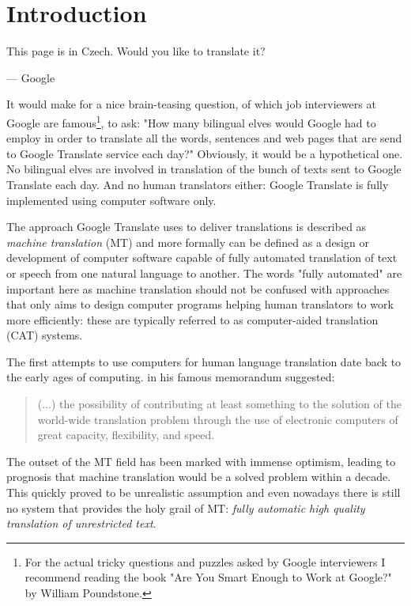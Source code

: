 \chapter{Introduction}
\label{chap:introduction}

\setlength{\epigraphwidth}{1.0\textwidth}
\epigraph{This page is in Czech. Would you like to translate it?}{--- Google}

It would make for a nice brain-teasing question, of which job interviewers
at Google are famous\footnote{For the actual tricky questions and puzzles
asked by Google interviewers I recommend reading the book "Are You Smart
Enough to Work at Google?" by William Poundstone.}, to ask:
"How many bilingual elves would Google had to employ in order to translate
all the words, sentences and web pages that are send to Google Translate
service each day?"
Obviously, it would be a hypothetical one. No bilingual elves are involved
in translation of the bunch of texts sent to Google Translate each day.
And no human translators either: Google Translate is fully implemented using
computer software only.

The approach Google Translate uses to deliver translations is described as
\emph{machine translation} (MT) and more formally can be defined as a design
or development of computer software capable of fully automated translation
of text or speech from one natural language to another.
The words "fully automated" are important here as machine translation should
not be confused with approaches that only aims to design computer programs
helping human translators to work more efficiently: these are typically
referred to as computer-aided translation (CAT) systems.

The first attempts to use computers for human language translation date
back to the early ages of computing. \citet{weaver:memorandum} in his famous
memorandum suggested:
\begin{quote}
(...) the possibility of contributing at least
something to the solution of the world-wide translation problem through the use
of electronic computers of great capacity, flexibility, and speed.
\end{quote}
The outset of the MT field has been marked with immense optimism, leading
to prognosis that machine translation would be a solved problem within
a decade. %
This quickly proved to be unrealistic assumption and even nowadays
there is still no system that provides the holy grail of MT:
\emph{fully automatic high quality translation of unrestricted text}.

